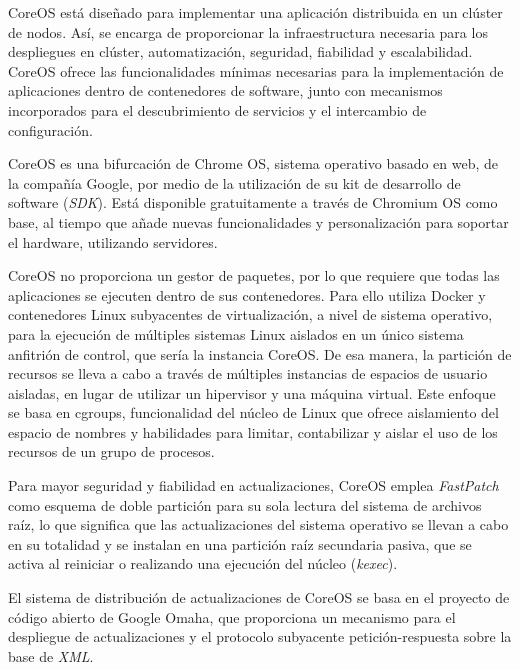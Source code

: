 CoreOS está diseñado para implementar una aplicación distribuida en un clúster de nodos. Así, se encarga de proporcionar la infraestructura necesaria para los despliegues en clúster, automatización, seguridad, fiabilidad y escalabilidad. CoreOS ofrece las funcionalidades mínimas necesarias para la implementación de aplicaciones dentro de contenedores de software, junto con mecanismos incorporados para el descubrimiento de servicios y el intercambio de configuración.

CoreOS es una bifurcación de Chrome OS, sistema operativo basado en web, de la compañía Google, por medio de la utilización de su kit de desarrollo de software (\textit{SDK}). Está disponible gratuitamente a través de Chromium OS como base, al tiempo que añade nuevas funcionalidades y personalización para soportar el hardware, utilizando servidores.

CoreOS no proporciona un gestor de paquetes, por lo que requiere que todas las aplicaciones se ejecuten dentro de sus contenedores. Para ello utiliza Docker y contenedores Linux subyacentes de virtualización, a nivel de sistema operativo, para la ejecución de múltiples sistemas Linux aislados en un único sistema anfitrión de control, que sería la instancia CoreOS. De esa manera, la partición de recursos se lleva a cabo a través de múltiples instancias de espacios de usuario aisladas, en lugar de utilizar un hipervisor y una máquina virtual. Este enfoque se basa en cgroups, funcionalidad del núcleo de Linux que ofrece aislamiento del espacio de nombres y habilidades para limitar, contabilizar y aislar el uso de los recursos de un grupo de procesos.

Para mayor seguridad y fiabilidad en actualizaciones, CoreOS emplea \textit{FastPatch} como esquema de doble partición para su sola lectura del sistema de archivos raíz, lo que significa que las actualizaciones del sistema operativo se llevan a cabo en su totalidad y se instalan en una partición raíz secundaria pasiva, que se activa al reiniciar o realizando una ejecución del núcleo (\textit{kexec}).

El sistema de distribución de actualizaciones de CoreOS se basa en el proyecto de código abierto de Google Omaha, que proporciona un mecanismo para el despliegue de actualizaciones y el protocolo subyacente petición-respuesta sobre la base de \textit{XML}.


